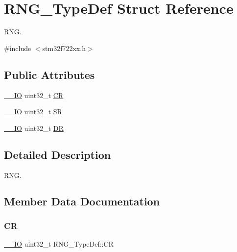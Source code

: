\hypertarget{struct_r_n_g___type_def}{}\section{R\+N\+G\+\_\+\+Type\+Def Struct Reference}
\label{struct_r_n_g___type_def}


R\+NG.  




{\ttfamily \#include $<$stm32f722xx.\+h$>$}

\subsection*{Public Attributes}
\begin{DoxyCompactItemize}
\item 
\mbox{\hyperlink{core__sc300_8h_aec43007d9998a0a0e01faede4133d6be}{\+\_\+\+\_\+\+IO}} uint32\+\_\+t \mbox{\hyperlink{struct_r_n_g___type_def_ab422a7aeea33d29d0f8b841bb461e3a8}{CR}}
\item 
\mbox{\hyperlink{core__sc300_8h_aec43007d9998a0a0e01faede4133d6be}{\+\_\+\+\_\+\+IO}} uint32\+\_\+t \mbox{\hyperlink{struct_r_n_g___type_def_a4e4c38cd6a078fea5f9fa5e31bc0d326}{SR}}
\item 
\mbox{\hyperlink{core__sc300_8h_aec43007d9998a0a0e01faede4133d6be}{\+\_\+\+\_\+\+IO}} uint32\+\_\+t \mbox{\hyperlink{struct_r_n_g___type_def_a89f3352fb11cca430aaecc0c9b49c6d3}{DR}}
\end{DoxyCompactItemize}


\subsection{Detailed Description}
R\+NG. 

\subsection{Member Data Documentation}
\mbox{\label{struct_r_n_g___type_def_ab422a7aeea33d29d0f8b841bb461e3a8}} 
\subsubsection{\texorpdfstring{CR}{CR}}
{\footnotesize\ttfamily \mbox{\hyperlink{core__sc300_8h_aec43007d9998a0a0e01faede4133d6be}{\+\_\+\+\_\+\+IO}} uint32\+\_\+t R\+N\+G\+\_\+\+Type\+Def\+::\+CR}

